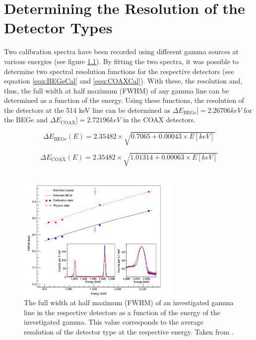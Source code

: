 \appendix

\chapter{Determining the Resolution of the Detector Types}
\label{sec:ResDetermination}


Two calibration spectra have been recorded using different gamma sources at various energies (see figure \ref{fig:Aufloesung})\cite{agostini_background_2017}.
By fitting the two spectra, it was possible to determine two spectral resolution functions for the respective detectors (see equation \ref{equ:BEGeCal} and \ref{equ:COAXCal}).
With these, the resolution and, thus, the full width at half maximum (FWHM) of any gamma line can be determined as a function of the energy.
Using these functions, the resolution of the detectors at the 514 keV line can be determined as $\Delta E_{\mathrm{BEGe}}] =2.26706 \unit{keV}$ for the BEGe and $\Delta E_{\mathrm{COAX}}] = 2.72196 \unit{keV}$ in the COAX detectors.



\begin{equation}
\Delta E_{\mathrm{BEGe}}(E) = 2.35482 \times \sqrt{0.7065+0.00043\times E[\unit{keV}]}
\label{equ:BEGeCal}
\end{equation}

\begin{equation}
\Delta E_{\mathrm{COAX}}(E) = 2.35482 \times \sqrt{1.01314+0.00063\times E[\unit{keV}]}
\label{equ:COAXCal}
\end{equation}
\\

\begin{figure}[t!]
	\centering
	\ifmakefigures%
	\includegraphics[width=80mm]{./Bilder/Aufloesung.png}
	\fi%
	\caption{
		The full width at half maximum (FWHM) of an investigated gamma line in the respective detectors as a function of the energy of the investigated gamma.
		This value corresponds to the average resolution of the detector type at the respective energy.
		Taken from \cite{agostini_background_2017}.
	}
	\label{fig:Aufloesung}
\end{figure}

